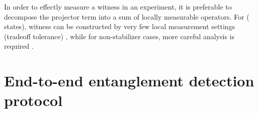 \documentclass[
reprint,
aps,
pra,
floatfix,
]{revtex4-2}
\theoremstyle{plain}
\theoremstyle{definition}
\newtheorem{remark}{Remark}
\begin{document}
In order to effectly measure a witness in an experiment, it is preferable to decompose the projector term into a sum of locally measurable operators. 
For  ( states),
witness can be constructed by very few local measurement settings (tradeoff tolerance) \cite{tothDetectingGenuineMultipartite2005} \cite{tothEntanglementDetectionStabilizer2005} \cite{zhouDetectingMultipartiteEntanglement2019},
while for non-stabilizer cases, more careful analysis is required \cite{zhangEfficientEntanglementGeneration2021} \cite{zhuMachineLearningDerivedEntanglement2021}.

\section{End-to-end entanglement detection protocol}\label{sec:protocol}
\end{document}
